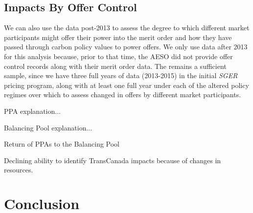 \documentclass[12pt]{article}
\newcommand{\SGER}{\textit{SGER} }
\begin{document}
\subsection{Impacts By Offer Control}
We can also use the data post-2013 to assess the degree to which different market participants might offer their power into the merit order and how they have passed through carbon policy values to power offers. We only use data after 2013 for this analysis because, prior to that time, the AESO did not provide offer control records along with their merit order data. The remains a sufficient sample, since we have three full years of data (2013-2015) in the initial \SGER pricing program, along with at least one full year under each of the altered policy regimes over which to assess changed in offers by different market participants.



PPA explanation...

Balancing Pool explanation...

Return of PPAs to the Balancing Pool

Declining ability to identify TransCanada impacts because of changes in resources.





\section{Conclusion}




\end{document}
